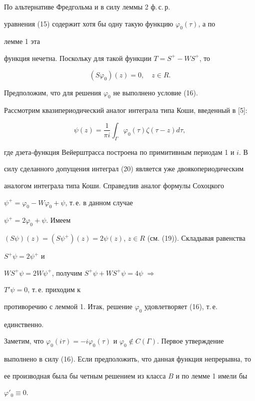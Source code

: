 \begin{pf} 


По альтернативе Фредгольма и в силу леммы 2 ф.\,с.\,р. 


уравнения (15) содержит хотя бы одну такую функцию $\varphi_0(\tau)$, а по 


лемме 1 эта 


функция нечетна. Поскольку для такой функции $T=S^+-WS^+$, то 


\begin{equation} 


(S\varphi_0)(z)=0,\quad z\in R. 


\end{equation} 


 


Предположим, что для решения $\varphi_0$ не выполнено условие (16). 


Рассмотрим квазипериодический аналог интеграла типа Коши, введенный в [5]: 


\begin{equation} 


\psi(z)=\frac{1}{\pi i}\int_\Gamma \varphi_0(\tau)\zeta(\tau-z)d\tau, 


\end{equation} 


где дзета-функция Вейерштрасса построена по примитивным периодам 1 и $i$. В 


силу сделанного допущения интеграл (20) является уже двоякопериодическим 


аналогом интеграла типа Коши. Справедлив аналог формулы Сохоцкого 


$\psi^+=\varphi_0-W\varphi_0+\psi$, т.\,е. в данном случае 


$\psi^+=2\varphi_0+\psi$. Имеем 


$(S\psi)(z)=(S\psi^+)(z)=2\psi(z)$, $z\in R$ (см. (19)). Складывая равенства 


$S^+\psi=2\psi^+$ и 


$WS^+\psi=2W\psi^+$, получим $S^+\psi+WS^+\psi=4\psi$ $\Rightarrow$ 


$T'\psi=0$, т.\,е. приходим к 


противоречию с леммой 1. Итак, решение $\varphi_0$ удовлетворяет (16), т.\,е. 


единственно. 


 


Заметим, что $\varphi_0(i\tau)=-i\varphi_0(\tau)$ и $\varphi_0\notin 


C(\Gamma)$. Первое утверждение 


выполнено в силу (16). Если предположить, что данная функция непрерывна, то 


ее производная была бы четным решением из класса $B$ и по лемме 1 имели бы 


$\varphi'_0\equiv0$. 


\end{pf} 



